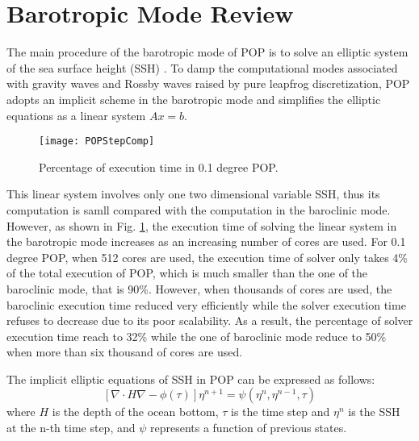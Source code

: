 \documentclass{sig-alternate}
\begin{document}
\section{Barotropic Mode Review} \label{se:baro}
The main procedure of the barotropic mode of POP is to solve an elliptic system of the sea surface height (SSH) \cite{pop05}. 
To damp the computational modes  associated with gravity waves and Rossby waves raised by pure leapfrog discretization, POP adopts an implicit scheme in the barotropic mode and simplifies the elliptic equations as a linear system $Ax=b$.

\begin {figure}
\centering
\texttt{[image: POPStepComp]}
\caption[] {Percentage of execution time in 0.1 degree POP.\label{fig:StepComp}}
\end{figure}
This linear system involves only one two dimensional variable SSH, thus its computation is samll compared with the computation in the baroclinic mode. However, as shown in Fig. \ref{fig:StepComp}, the execution time of solving the linear system in the barotropic mode increases as an increasing number of cores are used. 
For 0.1 degree POP, when 512 cores are used, the execution time of solver only takes 4\% of the total execution of POP, which is much smaller than the one of
the baroclinic mode, that is 90\%. 
However, when thousands of cores are used, the baroclinic execution time reduced very efficiently while the solver execution time refuses to decrease due to its poor scalability. 
As a result, the percentage of solver execution time reach to 32\% while the one of baroclinic mode reduce to 50\% when more than six thousand of cores are used. 


The implicit elliptic equations of SSH in POP can be expressed as follows:
\begin{equation}
\label{eq:ssh}
[\nabla \cdot H\nabla  -\phi(\tau)]\eta^{n+1} = \psi(\eta^n,\eta^{n-1},\tau)
\end{equation}
where $H$ is the depth of the ocean bottom, $\tau$ is the time step  and $\eta^n$ is the SSH at the n-th time step, and $\psi$ represents a function of previous states.
\end{document}
